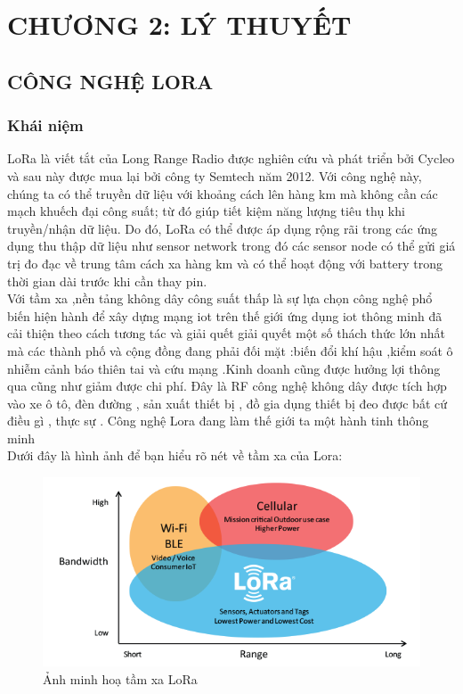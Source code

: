\section*{CHƯƠNG 2: LÝ THUYẾT}
\setcounter{section}{2}
\setcounter{subsection}{0}
\subsection{CÔNG NGHỆ LORA}
\subsubsection{Khái niệm}
LoRa là viết tắt của Long Range Radio được nghiên cứu và phát triển bởi Cycleo và sau này được mua lại bởi công ty Semtech năm 2012. Với công nghệ này, chúng ta có thể truyền dữ liệu với khoảng cách lên hàng km mà không cần các mạch khuếch đại công suất; từ đó giúp tiết kiệm năng lượng tiêu thụ khi truyền/nhận dữ liệu. Do đó, LoRa có thể được áp dụng rộng rãi trong các ứng dụng thu thập dữ liệu như sensor network trong đó các sensor node có thể gửi giá trị đo đạc về trung tâm cách xa hàng km và có thể hoạt động với battery trong thời gian dài trước khi cần thay pin.\\
\indent Với tầm xa ,nền tảng không dây công suất thấp là sự lựa chọn công nghệ phổ biến hiện hành để xây dựng mạng iot trên thế giới ứng dụng iot thông minh đã cải thiện theo cách tương tác và giải quết giải quyết một số thách thức lớn nhất mà các thành phố và cộng đồng đang phải đối mặt :biến đổi khí hậu ,kiểm soát ô nhiễm cảnh báo thiên tai và cứu mạng .Kinh doanh cũng được hưởng lợi thông qua cũng như giảm được chi phí. Đây là RF công nghệ không dây được tích hợp vào xe ô tô, đèn đường , sản xuất thiết bị , đồ gia dụng thiết bị đeo được bất cứ điều gì , thực sự . Công nghệ Lora đang làm thế giới ta một hành tinh thông minh\\
\indent Dưới đây là hình ảnh để bạn hiểu rõ nét về tầm xa của Lora:
\begin{figure}[H]
	\centering
	\includegraphics[scale=.5]{Chapter 2/image chapter 2/tamxaLoRa.png}
	\caption[Ảnh minh hoạ tầm xa LoRa]{Ảnh minh hoạ tầm xa LoRa}
	\label{hinh21}
\end{figure}
